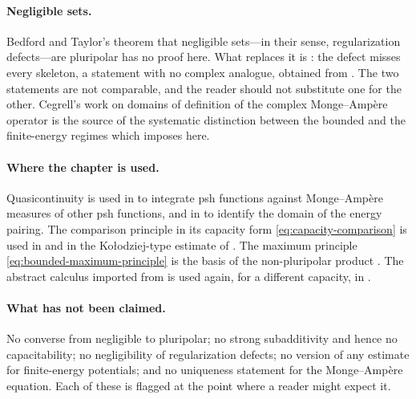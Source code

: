 \paragraph{Negligible sets.}  Bedford and Taylor's theorem that negligible
sets---in their sense, regularization defects---are pluripolar
\cite{BT82} has no proof here.  What replaces it is
: the defect misses every skeleton, a
statement with no complex analogue, obtained from
.  The two statements are not comparable, and
the reader should not substitute one for the other.  Cegrell's work on
domains of definition of the complex Monge--Amp\`ere operator
\cite{Ceg98,Ceg04} is the source of the systematic distinction between the
bounded and the finite-energy regimes which
 imposes here.

\paragraph{Where the chapter is used.}  Quasicontinuity is used in
 to integrate psh functions against Monge--Amp\`ere
measures of other psh functions, and in
 to identify the domain of the energy
pairing.  The comparison principle in its capacity form
\eqref{eq:capacity-comparison} is used in
 and in the Ko\l odziej-type estimate
 of .  The
maximum principle \eqref{eq:bounded-maximum-principle} is the basis of the
non-pluripolar product .  The abstract calculus
imported from  is used again, for a different
capacity, in .

\paragraph{What has not been claimed.}  No converse from negligible to
pluripolar; no strong subadditivity and hence no capacitability; no
negligibility of regularization defects; no version of any estimate for
finite-energy potentials; and no uniqueness statement for the
Monge--Amp\`ere equation.  Each of these is flagged at the point where a
reader might expect it.
